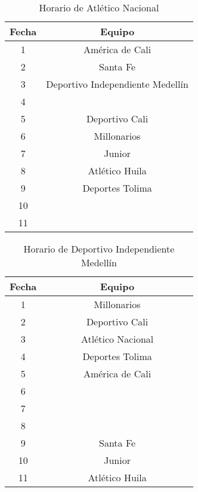 \documentclass[11pt]{article}
\begin{document}
\begin{multicols}{2}
            \begin{table}[H]
                \centering
                \begin{tabular}{|c||c|}
                    \hline
                    Fecha & Equipo\\ \hline
                    1 & América de Cali \\ \hline
                    2 & Santa Fe \\ \hline
                    3 & Deportivo Independiente Medellín \\ \hline
                    4 &  \\ \hline
                    5 & Deportivo Cali \\ \hline
                    6 & Millonarios \\ \hline
                    7 & Junior \\ \hline
                    8 & Atlético Huila \\ \hline
                    9 & Deportes Tolima \\ \hline
                    10 &  \\ \hline
                    11 &  \\ \hline
                \end{tabular} 
                \caption{Horario de Atlético Nacional}
            \end{table}

            \begin{table}[H]
                \centering
                \begin{tabular}{|c||c|}
                    \hline
                    Fecha & Equipo\\ \hline
                    1 & Millonarios \\ \hline
                    2 & Deportivo Cali \\ \hline
                    3 & Atlético Nacional \\ \hline
                    4 & Deportes Tolima  \\ \hline
                    5 & América de Cali \\ \hline
                    6 & \textcolor{white}{Deportivo Independiente Medellín} \\ \hline
                    7 &  \\ \hline
                    8 &  \\ \hline
                    9 & Santa Fe\\ \hline
                    10 & Junior \\ \hline
                    11 & Atlético Huila \\ \hline
                \end{tabular} 
                \caption{Horario de Deportivo Independiente Medellín}
            \end{table}


\end{multicols}
\end{document}
